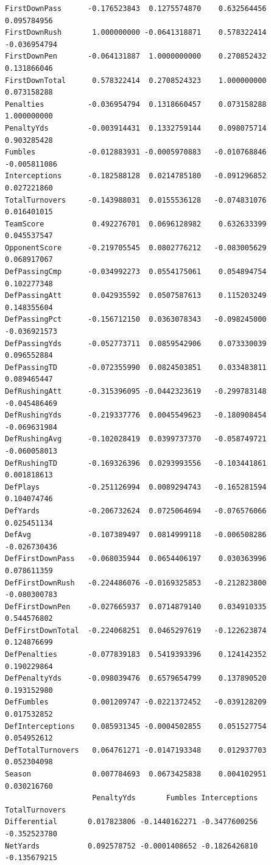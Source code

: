 \documentclass[
  letterpaper,
  DIV=11,
  numbers=noendperiod]{scrreprt}
\begin{document}
\begin{verbatim}
FirstDownPass      -0.176523843  0.1275574870    0.632564456  0.095784956
FirstDownRush       1.000000000 -0.0641318871    0.578322414 -0.036954794
FirstDownPen       -0.064131887  1.0000000000    0.270852432  0.131866046
FirstDownTotal      0.578322414  0.2708524323    1.000000000  0.073158288
Penalties          -0.036954794  0.1318660457    0.073158288  1.000000000
PenaltyYds         -0.003914431  0.1332759144    0.098075714  0.903285428
Fumbles            -0.012883931 -0.0005970883   -0.010768846 -0.005811086
Interceptions      -0.182588128  0.0214785180   -0.091296852  0.027221860
TotalTurnovers     -0.143988031  0.0155536128   -0.074831076  0.016401015
TeamScore           0.492276701  0.0696128982    0.632633399  0.045537547
OpponentScore      -0.219705545  0.0802776212   -0.083005629  0.068917067
DefPassingCmp      -0.034992273  0.0554175061    0.054894754  0.102277348
DefPassingAtt       0.042935592  0.0507587613    0.115203249  0.148355604
DefPassingPct      -0.156712150  0.0363078343   -0.098245000 -0.036921573
DefPassingYds      -0.052773711  0.0859542906    0.073330039  0.096552884
DefPassingTD       -0.072355990  0.0824503851    0.033483811  0.089465447
DefRushingAtt      -0.315396095 -0.0442323619   -0.299783148 -0.045486469
DefRushingYds      -0.219337776  0.0045549623   -0.180908454 -0.069631984
DefRushingAvg      -0.102028419  0.0399737370   -0.058749721 -0.060058013
DefRushingTD       -0.169326396  0.0293993556   -0.103441861  0.001818613
DefPlays           -0.251126994  0.0089294743   -0.165281594  0.104074746
DefYards           -0.206732624  0.0725064694   -0.076576066  0.025451134
DefAvg             -0.107389497  0.0814999118   -0.006508286 -0.026730436
DefFirstDownPass   -0.068035944  0.0654406197    0.030363996  0.078611359
DefFirstDownRush   -0.224486076 -0.0169325853   -0.212823800 -0.080300783
DefFirstDownPen    -0.027665937  0.0714879140    0.034910335  0.544576802
DefFirstDownTotal  -0.224068251  0.0465297619   -0.122623874  0.124876699
DefPenalties       -0.077839183  0.5419393396    0.124142352  0.190229864
DefPenaltyYds      -0.098039476  0.6579654799    0.137890520  0.193152980
DefFumbles          0.001209747 -0.0221372452   -0.039128209  0.017532852
DefInterceptions    0.085931345 -0.0004502855    0.051527754  0.054952612
DefTotalTurnovers   0.064761271 -0.0147193348    0.012937703  0.052304098
Season              0.007784693  0.0673425838    0.004102951  0.030216760
                    PenaltyYds       Fumbles Interceptions TotalTurnovers
Differential       0.017823806 -0.1440162271 -0.3477600256   -0.352523780
NetYards           0.092578752 -0.0001408652 -0.1826426810   -0.135679215

\end{verbatim}
\end{document}
